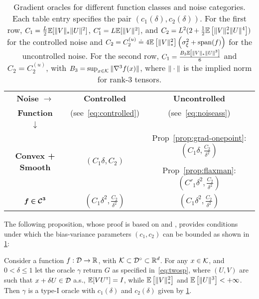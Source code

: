 \begin{table}
\small
\centering
\begin{tabular}{|c|c|c|}
\toprule
\textbf{Noise }$\bm{ \rightarrow}$ & \textbf{Controlled } & \textbf{Uncontrolled } \\
\textbf{Function } &(see~\eqref{eq:controlled})&(see~\eqref{eq:noiseass})\\
$\bm{\downarrow}$ &&\\\midrule
\multirow{3}{*}{\textbf{Convex + Smooth}} & \multirow{3}{*}{$(C_1 \delta, C_2)$} & %
{Prop~\ref{prop:grad-onepoint}: $(C_1\delta, \frac{C_2}{\delta^2}) $}\\
&& \\
 &&{Prop~\ref{prop:flaxman}: $(C'_1\delta^2, \frac{C_2}{\delta^2}) $}\\\midrule
\multirow{2}{*}{$\bm{f \in \mathcal{C}^3}$} & \multirow{2}{*}{$(C_1 \delta^2, \frac{C_2}{\delta^2})$} & \multirow{2}{*}{$(C_1 \delta^2, \frac{C_2}{\delta^2})$} \\
 &&\\\bottomrule
\end{tabular}
\caption{Gradient oracles for different function classes and noise categories. Each table entry specifies the pair $(c_1(\delta), c_2(\delta))$.
For the first row, $C_1 =
\frac{L}{2} \mathbb{E}[ \|V\|_* \|U\|^2]$, $C'_1=L \mathbb{E}[\|V\|^2]$, and
$C_2 =   L^2 (2 + \frac{1}{2}\mathbb{E}\left[ \|V\|_*^2 \|U\|^4 \right])$
for the controlled noise and
 $C_2 =  C_{2}^{(u)} \doteq 4 \mathbb{E}\left[\|V\|_*^2\right]\left( \sigma_\xi^2+\operatorname{span}(f)\right)$ for the uncontrolled noise.
For the second row, $C_1 = \frac{B_3 \mathbb{E}\left[ \|V\|_* \|U\|^3 \right]}{6}$ and $C_2 =  C_{2}^{(u)}$,
with $B_3 = \sup_{x\in \mathcal{K}} \|\nabla^3 f(x)\|$, where $\|\cdot\|$ is the implied norm for rank-3 tensors.
}
\label{tab:oracles}
\end{table}
The following proposition, whose proof is based on \citep[Lemma~1]{spall1992multivariate} and \citep[Lemma~1]{duchi2015optimal}, provides conditions under which the bias-variance parameters $(c_1,c_2)$ can be bounded as shown in \cref{tab:oracles}:
\begin{proposition}
\label{prop:grad-spsa}
Consider a function $f:\mathcal{D} \to \mathbb{R}$, with $\mathcal{K} \subset \mathcal{D}^\circ \subset \mathbb{R}^d$. %
For any $x \in \mathcal{K}$, and $0< \delta \le 1$ let the oracle $\gamma$ return $G$ as specified in~\eqref{eq:twosp},
where $(U,V)$ are such that $x+\delta U \in \mathcal{D}$ a.s.,
$\mathbb{E}[V U^\mathsf{\scriptscriptstyle T}] = I$, while
$\mathbb{E}\left[\|V\|_*^2\right]$ and $\mathbb{E}\left[ \|U\|^3 \right]<+\infty$.
Then $\gamma$ is a type-I oracle with $c_1(\delta)$ and $c_2(\delta)$ given by \cref{tab:oracles}.
\end{proposition}

